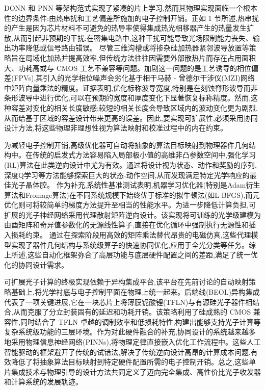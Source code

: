 DONN 和 PNN 等架构范式实现了紧凑的片上学习,然而其物理实现面临一个根本性的边界条件:由热串扰和工艺偏差所施加的电子控制开销。正如 1 节所述,热串扰的产生是因为芯片材料不可避免的热导率使得集成热光相移器产生的热量发生扩散,从而引起非预期的干扰;在密集电路中,这种干扰可能导致光场限制能力丧失、输出功率降低或信号路由错误。\citep{doi_10_1109_access_2020_3013116_8fec1fb2} 尽管三维沟槽或将掺杂硅加热器紧邻波导放置等策略旨在局域化加热并提高效率,但传统方法往往因需要外部散热片而存在占用面积大、功耗高或与 CMOS 工艺不兼容等问题。加剧这一问题的是工艺诱导的相位偏差(FPVs),其引入的光学相位噪声会劣化基于相干马赫 - 曾德尔干涉仪(MZI)网络中矩阵向量乘法的精度。证据表明,优化标称波导宽度,特别是在刻蚀脊形波导而非条形波导中进行优化,可以在预期的宽度和厚度变化下显著恢复标称精度。然而,这种容差对变化的相关长度敏感;较短的相关长度会导致区域内的波动变化更为剧烈,从而给基于区域的容差设计带来更高的误差。因此,要实现可扩展性,必须采用协同设计方法,将这些物理非理想性视为算法映射和校准过程中的内在约束。\citep{doi_10_1109_access_2020_3013116_8fec1fb2} \citep{doi_10_1109_tnano_2022_3223915_d4da3e6b}

为减轻电子控制开销,高级优化器可自动将抽象的算法目标映射到物理器件几何结构中。在传统的启发式方法容易陷入局部极小值的高维非凸参数空间中,强化学习(RL)算法在此类逆向设计中尤为有效。通过将设计视为状态、动作和奖励的序列,深度Q学习等方法能够探索巨大的状态-动作空间,从而发现满足特定光学响应的最佳光子晶体腔。\citep{doi_10_1515_nanoph_2022_0692_4b166807} 作为补充,系统性基准测试表明,机器学习优化器(特别是Adam衍生算法和Fromage算法)在不同系统规模下始终优于标准的拟牛顿法(如L-BFGS),而元优化则可将较简单的梯度方法提升至相当的性能水平。为进一步降低计算负担,可扩展的光子神经网络采用代理散射矩阵逆向设计。该实现将可训练的光学级建模为由酉矩阵和奇异值参数化的无源线性算子,直接在优化循环中强制执行无源性和插入损耗约束。\citep{s2_753a5d83a96e0194da93bcb6f20fa0bd356e37fa_c11e3796} 通过在探索阶段用高效的矩阵乘法替代昂贵的电磁仿真,这些代理模型实现了器件几何结构与系统级算子的快速协同优化,应用于全光分类等任务。综上所述,这些自动化框架弥合了高层功能与底层硬件配置之间的差距,满足了统一优化的协同设计需求。\citep{doi_10_1515_nanoph_2022_0692_4b166807} \citep{doi_10_1063_5_0238444_48bf2cbe} \citep{s2_753a5d83a96e0194da93bcb6f20fa0bd356e37fa_c11e3796}

可扩展光子计算的终极实现依赖于异构集成平台,该平台在先前讨论的自动映射策略基础上,将光学衬底与电子控制平面在物理上统一起来。后端线(BEOL)异构集成代表了一项关键进展,它在一块芯片上将薄膜铌酸锂(TFLN)与有源硅光子器件相结合,从而克服了分立封装固有的延迟和功耗开销。该策略利用了硅成熟的 CMOS 兼容性,同时结合了 TFLN 卓越的调制效率和低损耗特性,构建出能够支持光子计算等复杂系统级功能的三层环境。作为对此硬件融合的补充,协同设计的系统越来越多地采用物理信息神经网络(PINNs),将物理定律直接嵌入优化工作流程中。这些人工智能驱动的框架避开了传统的试错法,解决了传统逆向设计高昂的计算成本问题,有效降低了将抽象算法目标映射到特定硬件配置所需的电子控制开销。总之,这些单片集成技术与物理引导的设计方法共同定义了迈向完全集成、高性价比光子收发器和计算系统的发展轨迹。\citep{s2_9b444e84d20ae6e3d62d2d4df30268b5a53baad2_40af2cc9} \citep{s2_037e66f37189104d61c0d000de0cee202b7eec9e_d15b8018}

